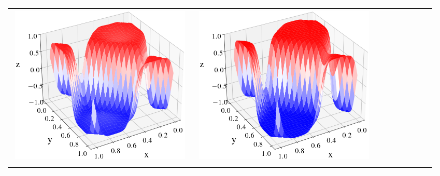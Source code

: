 \documentclass[12pt, reqno]{report}
\theoremstyle{definition}
\theoremstyle{remark}
\begin{document}
\begin{figure}[H]
\begin{tabular}{rccccc}
        \includegraphics[align = c, height=\subheight]{media_paper/CH_surf_FD_n=200.png} &
        \includegraphics[align = c, height=\subheight]{media_paper/CH_surf_FD_n=500.png} &

\end{tabular}
\end{figure}
\end{document}
